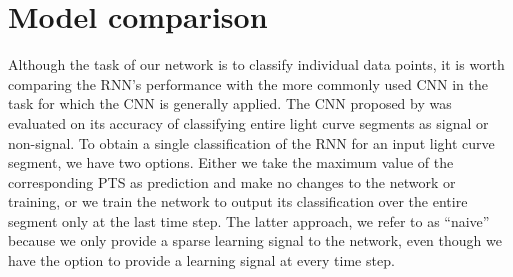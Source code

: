 
\section{Model comparison}
\label{sec:models}

Although the task of our network is to classify individual data points, it is worth comparing the RNN's performance with the more commonly used CNN in the task for which the CNN is generally applied. The CNN proposed by \cite{pearson2018searching} was evaluated on its accuracy of classifying entire light curve segments as signal or non-signal. To obtain a single classification of the RNN for an input light curve segment, we have two options. Either we take the maximum value of the corresponding PTS as prediction and make no changes to the network or training, or we train the network to output its classification over the entire segment only at the last time step. The latter approach, we refer to as ``naive'' because we only provide a sparse learning signal to the network, even though we have the option to provide a learning signal at every time step. 

